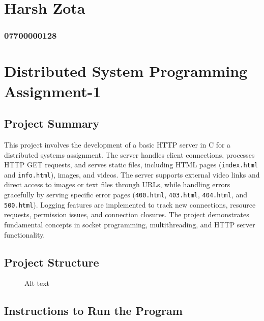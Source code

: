 \section{Harsh Zota}\label{harsh-zota}

\subsubsection{07700000128}\label{section}

\section{Distributed System Programming
Assignment-1}\label{distributed-system-programming-assignment-1}

\subsection{Project Summary}\label{project-summary}

This project involves the development of a basic HTTP server in C for a
distributed systems assignment. The server handles client connections,
processes HTTP GET requests, and serves static files, including HTML
pages (\texttt{index.html} and \texttt{info.html}), images, and videos.
The server supports external video links and direct access to images or
text files through URLs, while handling errors gracefully by serving
specific error pages (\texttt{400.html}, \texttt{403.html},
\texttt{404.html}, and \texttt{500.html}). Logging features are
implemented to track new connections, resource requests, permission
issues, and connection closures. The project demonstrates fundamental
concepts in socket programming, multithreading, and HTTP server
functionality.

\subsection{Project Structure}\label{project-structure}

\begin{figure}
\centering
{}
\caption{Alt text}
\end{figure}

\subsection{Instructions to Run the
Program}\label{instructions-to-run-the-program}

